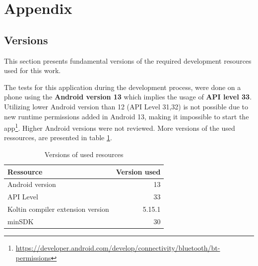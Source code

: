 
\appendix


\section{Appendix}
\subsection{Versions}
{\large 
	This section presents fundamental versions of the required development resources used for this work.
	
	The tests for this application during the development process, were done on a phone using the \textbf{Android version 13} which implies the usage of \textbf{API level 33}. Utilizing lower Android version than 12 (API Level 31,32) is not possible due to new runtime permissions added in Android 13, making it impossible to start the app\footnote{\url{https://developer.android.com/develop/connectivity/bluetooth/bt-permissions}}. Higher Android versions were not reviewed. More versions of the used ressources, are presented in table \ref{tab:versionTable}.
	\begin{table}[h!]
		\begin{center}
			\caption{Versions of used resources}
			\label{tab:versionTable}
			\begin{tabular}{l|r} %
				\textbf{Ressource} & \textbf{Version used} \\
				\hline
				Android version& 13 \\
				API Level & 33 \\
				Koltin compiler extension version & 5.15.1 \\
				minSDK & 30\\
			\end{tabular}
		\end{center}
	\end{table}
}